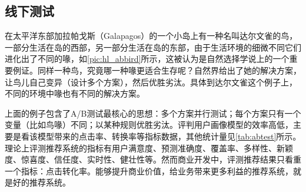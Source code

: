   \subsection{线下测试}
  在太平洋东部加拉帕戈斯（Galapagos）的一个小岛上有一种名叫达尔文雀的鸟，一部分生活在岛的西部，另一部分生活在岛的东部，由于生活环境的细微不同它们进化出了不同的喙，如\autoref{pic:hl_abbird}所示，这被认为是自然选择学说上的一个重要例证。同样一种鸟，究竟哪一种喙更适合生存呢？自然界给出了她的解决方案，让鸟儿自己变异（设计多个方案），然后优胜劣汰。具体到达尔文雀这个例子上，不同的环境中喙也有不同的解决方案。
  \begin{figure}
  \centering
    \label{pic:hl_abbird}
  \end{figure}
  上面的例子包含了A/B测试最核心的思想：多个方案并行测试；每个方案只有一个变量（比如鸟喙）不同；以某种规则优胜劣汰。评判用户画像模型的效率高低，主要是看该模型带来的点击率、转换率等指标数据，其他统计量见\autoref{tab:abtest}所示。理论上评测推荐系统的指标有用户满意度、预测准确度、覆盖率、多样性、新颖度、惊喜度、信任度、实时性、健壮性等。然而商业开发中，评测推荐结果只看重一个指标：点击转化率。能够提升商业价值，给业务带来更多利益的推荐系统，就是好的推荐系统。
